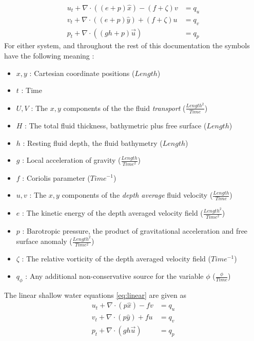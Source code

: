 \documentclass{softwaremanual}
\begin{document}
\begin{subequations}
\begin{align}
u_t  + \nabla \cdot \left( (e + p)\hat{x} \right) - (f+\zeta)v &=  q_u\\
v_t  + \nabla \cdot \left( (e + p)\hat{y} \right) + (f+\zeta)u &=  q_v\\
p_t + \nabla \cdot ( (gh+p)\vec{u} ) &= q_p
\end{align}\label{eq:skewsymmetric}
\end{subequations}
For either system, and throughout the rest of this documentation the symbols have the following meaning :
\begin{itemize}
\item[] $x, y$ : Cartesian coordinate positions ($Length$)
\item[] $t$    : Time
\item[] $U, V$ : The $x,y$ components of the the fluid \textit{transport} ($\frac{Length^2}{Time}$) 
\item[] $H$    : The total fluid thickness, bathymetric plus free surface ($Length$)
\item[] $h$    : Resting fluid depth, the fluid bathymetry ($Length$)
\item[] $g$    : Local acceleration of gravity ($\frac{Length}{Time^2}$)
\item[] $f$    : Coriolis parameter ($Time^{-1}$)
\item[] $u,v$  : The $x,y$ components of the \textit{depth average} fluid velocity ($\frac{Length}{Time}$)
\item[] $e$    : The kinetic energy of the depth averaged velocity field ($\frac{Length^2}{Time^2}$)
\item[] $p$    : Barotropic pressure, the product of gravitational acceleration and free surface anomaly ($\frac{Length^2}{Time^2}$)
\item[] $\zeta$ : The relative vorticity of the depth averaged velocity field ($Time^{-1}$)
\item[] $q_{\phi}$ : Any additional non-conservative source for the variable $\phi$ ($\frac{\phi}{Time}$) 
\end{itemize}

The linear shallow water equations \eqref{eq:linear} are given as
\begin{subequations}
\begin{align}
u_t  + \nabla \cdot \left( p\hat{x} \right) - fv &=  q_u\\
v_t  + \nabla \cdot \left( p\hat{y} \right) + fu &=  q_v\\
p_t + \nabla \cdot ( gh\vec{u} ) &= q_p
\end{align}\label{eq:linear}
\end{subequations}
\end{document}
